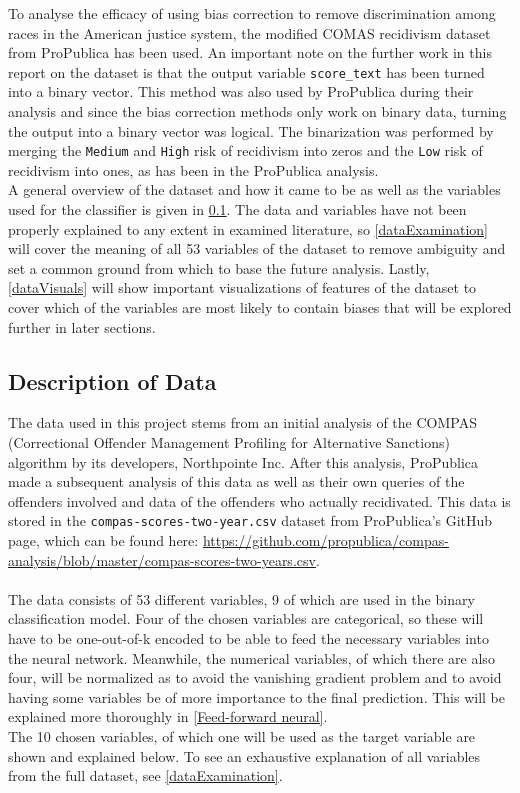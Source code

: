 \documentclass[11pt, fleqn, titlepage]{article}
\begin{document}
	\noindent To analyse the efficacy of using bias correction to remove discrimination among races in the American justice system, the modified COMAS recidivism dataset from ProPublica has been used. An important note on the further work in this report on the dataset is that the output variable \texttt{score\_text} has been turned into a binary vector. This method was also used by ProPublica during their analysis and since the bias correction methods only work on binary data, turning the output into a binary vector was logical. The binarization was performed by merging the \texttt{Medium} and \texttt{High} risk of recidivism into zeros and the \texttt{Low} risk of recidivism into ones, as has been in the ProPublica analysis. \\
	A general overview of the dataset and how it came to be as well as the variables used for the classifier is given in \ref{dataDescription}. The data and variables have not been properly explained to any extent in examined literature, so \ref{dataExamination} will cover the meaning of all 53 variables of the dataset to remove ambiguity and set a common ground from which to base the future analysis. Lastly, \ref{dataVisuals} will show important visualizations of features of the dataset to cover which of the variables are most likely to contain biases that will be explored further in later sections.
	
	\subsection{Description of Data} \label{dataDescription}
	The data used in this project stems from an initial analysis of the COMPAS (Correctional Offender Management Profiling for Alternative Sanctions) algorithm by its developers, Northpointe Inc. After this analysis, ProPublica made a subsequent analysis of this data as well as their own queries of the offenders involved and data of the offenders who actually recidivated. This data is stored in the \texttt{compas-scores-two-year.csv} dataset from ProPublica's GitHub page, which can be found here: \url{https://github.com/propublica/compas-analysis/blob/master/compas-scores-two-years.csv}. \\\\
	\noindent The data consists of 53 different variables, 9 of which are used in the binary classification model. Four of the chosen variables are categorical, so these will have to be one-out-of-k encoded to be able to feed the necessary variables into the neural network. Meanwhile, the numerical variables, of which there are also four, will be normalized as to avoid the vanishing gradient problem and to avoid having some variables be of more importance to the final prediction. This will be explained more thoroughly in \ref{Feed-forward neural}. \\
	The 10 chosen variables, of which one will be used as the target variable are shown and explained below. To see an exhaustive explanation of all variables from the full dataset, see \ref{dataExamination}.
	
\end{document}
